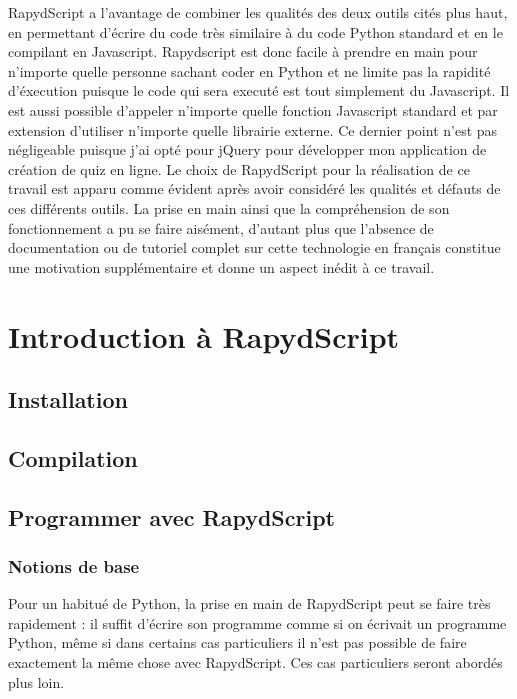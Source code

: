 \documentclass[letterpaper,10pt,french]{sphinxmanual}
\begin{document}
RapydScript a l'avantage de combiner les qualités des deux outils cités plus haut, en permettant d'écrire du code très similaire à du code Python standard et en le compilant en Javascript. Rapydscript est donc facile à prendre en main pour n'importe quelle personne sachant coder en Python et ne limite pas la rapidité d'éxecution puisque le code qui sera executé est tout simplement du Javascript. Il est aussi possible d'appeler n'importe quelle fonction Javascript standard et par extension d'utiliser n'importe quelle librairie externe. Ce dernier point n'est pas négligeable puisque j'ai opté pour jQuery pour développer mon application de création de quiz en ligne. Le choix de RapydScript pour la réalisation de ce travail est apparu comme évident après avoir considéré les qualités et défauts de ces différents outils. La prise en main ainsi que la compréhension de son fonctionnement a pu se faire aisément, d'autant plus que l'absence de documentation ou de tutoriel complet sur cette technologie en français constitue une motivation supplémentaire et donne un aspect inédit à ce travail.


\section{Introduction à RapydScript}
\label{rapydscript:introduction-a-rapydscript}

\subsection{Installation}
\label{rapydscript:installation}

\subsection{Compilation}
\label{rapydscript:compilation}

\subsection{Programmer avec RapydScript}
\label{rapydscript:programmer-avec-rapydscript}

\subsubsection{Notions de base}
\label{rapydscript:notions-de-base}
Pour un habitué de Python, la prise en main de RapydScript peut se faire très rapidement : il suffit d'écrire son programme comme si on écrivait un programme Python, même si dans certains cas particuliers il n'est pas possible de faire exactement la même chose avec RapydScript. Ces cas particuliers seront abordés plus loin.
\end{document}
